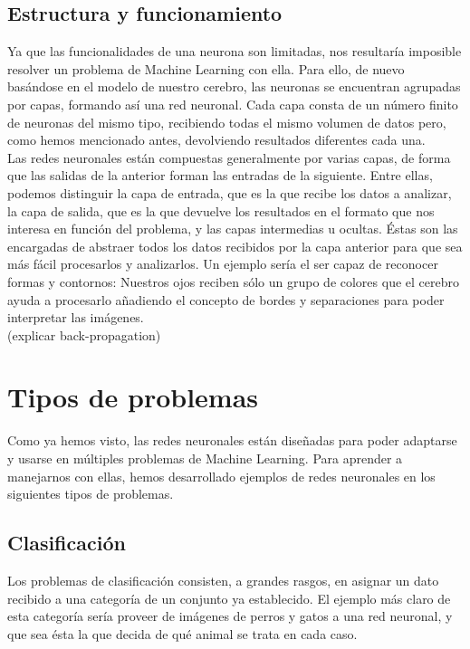 \subsection{Estructura y funcionamiento}
Ya que las funcionalidades de una neurona son limitadas, nos resultaría imposible resolver un problema de Machine Learning con ella. Para ello, de nuevo basándose en el modelo de nuestro cerebro, las neuronas se encuentran agrupadas por capas, formando así una red neuronal. Cada capa consta de un número finito de neuronas del mismo tipo, recibiendo todas el mismo volumen de datos pero, como hemos mencionado antes, devolviendo resultados diferentes cada una. \\

Las redes neuronales están compuestas generalmente por varias capas, de forma que las salidas de la anterior forman las entradas de la siguiente. Entre ellas, podemos distinguir la capa de entrada, que es la que recibe los datos a analizar, la capa de salida, que es la que devuelve los resultados en el formato que nos interesa en función del problema, y las capas intermedias u ocultas. Éstas son las encargadas de abstraer todos los datos recibidos por la capa anterior para que sea más fácil procesarlos y analizarlos. Un ejemplo sería el ser capaz de reconocer formas y contornos: Nuestros ojos reciben sólo un grupo de colores que el cerebro ayuda a procesarlo añadiendo el concepto de bordes y separaciones para poder interpretar las imágenes. \\

(explicar back-propagation)


\section{Tipos de problemas}
Como ya hemos visto, las redes neuronales están diseñadas para poder adaptarse y usarse en múltiples problemas de Machine Learning. Para aprender a manejarnos con ellas, hemos desarrollado ejemplos de redes neuronales en los siguientes tipos de problemas.

\subsection{Clasificación}
Los problemas de clasificación consisten, a grandes rasgos, en asignar un dato recibido a una categoría de un conjunto ya establecido. El ejemplo más claro de esta categoría sería proveer de imágenes de perros y gatos a una red neuronal, y que sea ésta la que decida de qué animal se trata en cada caso. \\

